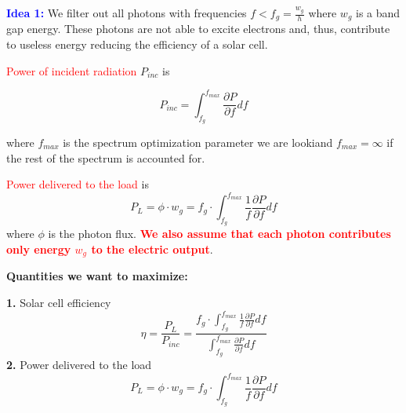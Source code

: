 \documentclass{beamer}
\begin{document}
\begin{frame}
\textcolor{blue}{\textbf{Idea 1:}} We filter out all photons with frequencies $f < f_{g} = \frac{w_{g}}{h}$ where $w_{g}$ is a band gap energy. These photons are not able to excite electrons and, thus,
contribute to useless energy reducing the efficiency of a solar cell.\\
\vspace{0.2cm}

\textcolor{red}{Power of incident radiation} $P_{inc}$ is 

$$ P_{inc} = \int_{f_{g}}^{f_{max}}\frac{\partial P}{\partial f}df$$

where $f_{max}$ is the spectrum optimization parameter we are lookiand $f_{max} = \infty$ if the rest of the spectrum is accounted for. 

\vspace{0.2cm}

\textcolor{red}{Power delivered to the load} is
$$ P_{L} = \phi\cdot w_g  = f_{g}\cdot \int_{f_{g}}^{f_{max}}\frac{1}{f}\frac{\partial P}{\partial f}df$$
where $\phi$ is the photon flux. \textcolor{red}{\textbf{We also assume that each photon contributes only energy $w_g$ to the electric output}}. 
\end{frame}




\begin{frame}

\begin{center}
\textbf{Quantities we want to maximize:}
\end{center}

\textbf{1.} Solar cell efficiency
$$ \eta = \frac{P_{L}}{P_{inc}} = \frac{f_{g}\cdot\int_{f_{g}}^{f_{max}}\frac{1}{f}\frac{\partial P}{\partial f}df}{\int_{f_{g}}^{f_{max}}\frac{\partial P}{\partial f}df}$$  
\textbf{2.} Power delivered to the load
$$ P_{L} = \phi\cdot w_g  = f_{g}\cdot \int_{f_{g}}^{f_{max}}\frac{1}{f}\frac{\partial P}{\partial f}df$$

\end{frame}
\end{document}
